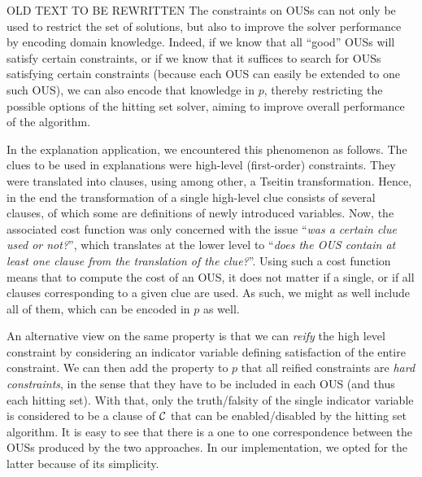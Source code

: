 {\color{OliveGreen} OLD TEXT TO BE REWRITTEN
The constraints on OUSs can not only be used to restrict the set of solutions, but also to improve the solver performance by encoding domain knowledge.
Indeed, if we know that all ``good'' OUSs will satisfy certain constraints, or if we know that it suffices to search for OUSs satisfying certain constraints (because each OUS can easily be extended to one such OUS),  we can also encode that knowledge in $p$, thereby restricting the possible options of the hitting set solver, aiming to improve overall performance of the algorithm. 

In the explanation application, we encountered this phenomenon as follows. 
The clues to be used in explanations were high-level (first-order) constraints. They were translated into clauses, using among other, a Tseitin transformation.
Hence, in the end the transformation of a single high-level clue consists of several clauses, of which some are definitions of newly introduced variables. 
Now, the associated cost function was only concerned with the issue ``\emph{was a certain clue used or not?}'', which translates at the lower level to ``\emph{does the OUS contain at least one clause from the translation of the clue?}''.
Using such a cost function means that to compute the cost of an OUS, it does not matter if a single, or if all clauses corresponding to a given clue are used. As such, we might as well include all of them, which can be encoded in $p$ as well. 

An alternative view on the same property is that we can \emph{reify} the high level constraint by considering an indicator variable defining satisfaction of the entire constraint. 
We can then add the property to $p$ that all reified constraints are \emph{hard constraints}, in the sense that they have to be included in each OUS (and thus each hitting set). With that, only the truth/falsity of the single indicator variable is considered to be a clause of $\mathcal{C} $ that can be enabled/disabled by the hitting set algorithm. 
It is easy to see that there is a one to one correspondence between the OUSs produced by the two approaches. In our implementation, we opted for the latter because of its simplicity. 


}
